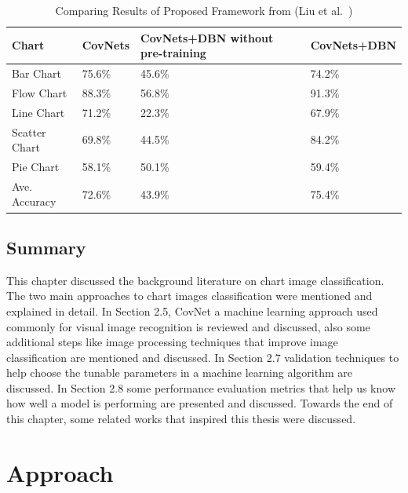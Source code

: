 \documentclass[12pt, a4paper,oneside]{report}
\begin{document}
\begin{table}[h]
	\centering {} \small
	\begin{tabular}{|p{3cm}|p{3cm}|p{3cm}|p{3cm}|}
		
		\hline
		Chart & CovNets&CovNets+DBN without pre-training & CovNets+DBN \\ \hline
				
		Bar Chart & 75.6\% & 45.6\% & 74.2\% \\ \hline
		Flow Chart & 88.3\%  & 56.8\% & 91.3\%  \\ \hline
		Line Chart  & 71.2\%  & 22.3\% & 67.9\% \\ \hline
	
		Scatter Chart & 69.8\% & 44.5\% & 84.2\% \\ \hline
		Pie Chart & 58.1\%  & 50.1\% & 59.4\%    \\ \hline
		Ave. Accuracy & 72.6\%  & 43.9\% & 75.4\% \\ \hline
		
	\end{tabular}
	\caption {Comparing Results of Proposed Framework from (Liu et al.~\cite{liu2015chart}) }	
	\label{table:deep}
\end{table}


\section{Summary}
This chapter discussed the background literature on chart image classification. The two main approaches to chart images classification were mentioned and explained in detail. In Section 2.5, CovNet a machine learning approach used commonly for visual image recognition is reviewed and discussed, also some additional steps like image processing techniques that improve image classification are mentioned and discussed.  In Section 2.7 validation techniques to help choose the tunable parameters in a machine learning algorithm are discussed. In Section 2.8 some performance evaluation metrics that help us know how well a model is performing are presented and discussed. Towards the end of this chapter, some related works that inspired this thesis were discussed.


\chapter{Approach}
\end{document}
